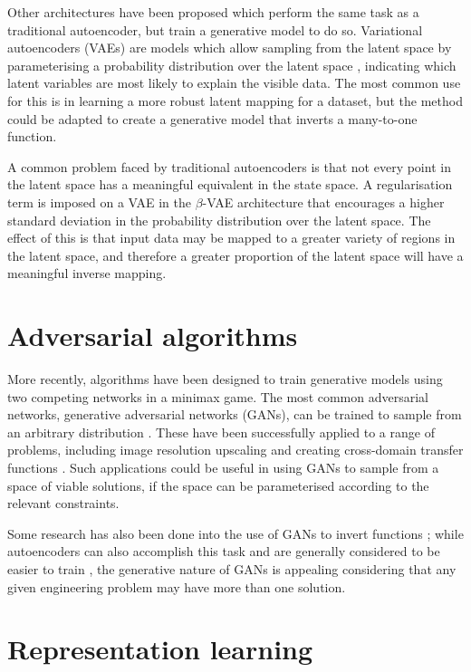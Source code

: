 \documentclass[../../main.tex]{subfiles}
\begin{document}
Other architectures have been proposed which perform the same task as a traditional autoencoder, but train a generative model to do so.
Variational autoencoders (VAEs) are models which allow sampling from the latent space by parameterising a probability distribution over the latent space \cite{kingma14},
indicating which latent variables are most likely to explain the visible data.
The most common use for this is in learning a more robust latent mapping for a dataset, but the method could be adapted to create a generative model that inverts a many-to-one function.

A common problem faced by traditional autoencoders is that not every point in the latent space has a meaningful equivalent in the state space.
A regularisation term is imposed on a VAE in the $\beta$-VAE architecture \cite{higgins16} that encourages a higher standard deviation in the probability distribution over the latent space.
The effect of this is that input data may be mapped to a greater variety of regions in the latent space,
and therefore a greater proportion of the latent space will have a meaningful inverse mapping.

\section{Adversarial algorithms}

More recently, algorithms have been designed to train generative models using two competing networks in a minimax game.
The most common adversarial networks, generative adversarial networks (GANs), can be trained to sample from an arbitrary distribution \cite{goodfellow14, horger18}.
These have been successfully applied to a range of problems, including image resolution upscaling \cite{ledig17} and creating cross-domain transfer functions \cite{zhu18}.
Such applications could be useful in using GANs to sample from a space of viable solutions, if the space can be parameterised according to the relevant constraints.

Some research has also been done into the use of GANs to invert functions \cite{anirudh18};
while autoencoders can also accomplish this task and are generally considered to be easier to train \cite{bang18},
the generative nature of GANs is appealing considering that any given engineering problem may have more than one solution.

\section{Representation learning}
\end{document}
